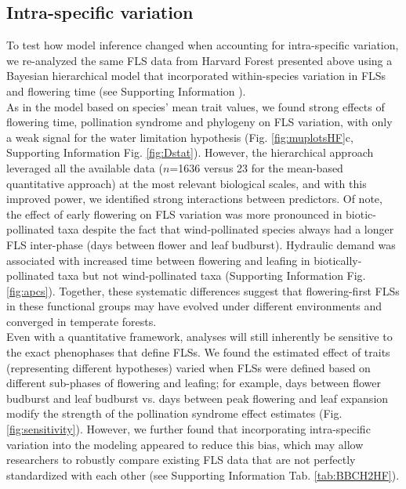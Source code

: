 \documentclass[11pt]{article}
\begin{document}
\subsection*{Intra-specific variation}
\noindent To test how model inference changed when accounting for intra-specific variation, we re-analyzed the same FLS data from Harvard Forest presented above using a Bayesian hierarchical model that incorporated within-species variation in FLSs and flowering time (see Supporting Information ).\\

\noindent As in the model based on species' mean trait values, we found strong effects of flowering time, pollination syndrome and phylogeny on FLS variation, with only a weak signal for the water limitation  hypothesis (Fig. \ref{fig:muplotsHF}c, Supporting Information Fig. \ref{fig:Dstat}). However, the hierarchical approach leveraged all the available data ($n$=1636 versus 23 for the mean-based quantitative approach) at the most relevant biological scales, and with this improved power, we identified strong interactions between predictors. Of note, the effect of early flowering on FLS variation was more pronounced in biotic-pollinated taxa despite the fact that wind-pollinated species always had a longer FLS inter-phase (days between flower and leaf budburst). Hydraulic demand  was associated with increased time between flowering and leafing in biotically-pollinated taxa but not wind-pollinated taxa (Supporting Information Fig. \ref{fig:apcs}). Together, these systematic differences suggest that flowering-first FLSs in these functional groups may have evolved under different environments and converged in temperate forests.\\

\noindent Even with a quantitative framework, analyses will still inherently be sensitive to the exact phenophases that define FLSs. We found the estimated effect of traits (representing different hypotheses) varied when FLSs were defined based on different sub-phases of flowering and leafing; for example, days between flower budburst and leaf budburst vs. days between peak flowering and leaf expansion modify the strength of the pollination syndrome effect estimates (Fig. \ref{fig:sensitivity}). However, we further found that incorporating intra-specific variation into the modeling appeared to reduce this bias, which may allow researchers to robustly compare existing FLS data  that are not perfectly standardized with each other (see Supporting Information Tab. \ref{tab:BBCH2HF}).\\
\end{document}
